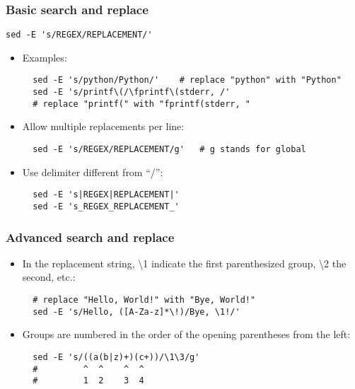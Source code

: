 \documentclass[12pt]{article}
\begin{document}
\subsubsection{Basic search and replace}

\begin{lstlisting}
sed -E 's/REGEX/REPLACEMENT/'
\end{lstlisting}

\begin{itemize}
  \item Examples:
  \begin{lstlisting}
  sed -E 's/python/Python/'    # replace "python" with "Python"
  sed -E 's/printf\(/\fprintf\(stderr, /' 
  # replace "printf(" with "fprintf(stderr, "
  \end{lstlisting}
  
  \item Allow multiple replacements per line:
  \begin{lstlisting}
  sed -E 's/REGEX/REPLACEMENT/g'   # g stands for global
  \end{lstlisting}
  
  \item Use delimiter different from ``/'':
  \begin{lstlisting}
  sed -E 's|REGEX|REPLACEMENT|'
  sed -E 's_REGEX_REPLACEMENT_'
  \end{lstlisting}
\end{itemize}

\subsubsection{Advanced search and replace}

\begin{itemize}
  \item In the replacement string, \textbackslash1 indicate the first parenthesized group, \textbackslash2 the second, etc.:
  \begin{lstlisting}
  # replace "Hello, World!" with "Bye, World!"
  sed -E 's/Hello, ([A-Za-z]*\!)/Bye, \1!/'
  \end{lstlisting}
  
  \item Groups are numbered in the order of the opening parentheses from the left:
  \begin{lstlisting}
  sed -E 's/((a(b|z)+)(c+))/\1\3/g'
  #         ^  ^    ^  ^
  #         1  2    3  4
  \end{lstlisting}
\end{itemize}
\end{document}
